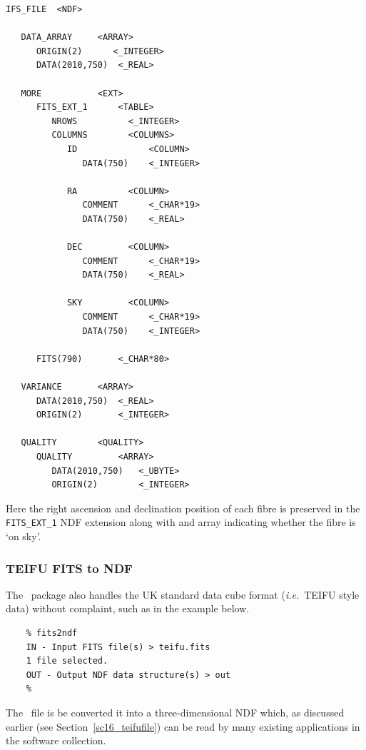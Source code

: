 \documentclass[twoside,11pt]{article}
\newcommand{\htmlref}[2]{#1}
\newcommand{\latex}[1]{#1}
\newcommand{\xref}[3]{#1}
\begin{document}
\small\begin{verbatim}
IFS_FILE  <NDF>

   DATA_ARRAY     <ARRAY>
      ORIGIN(2)      <_INTEGER>
      DATA(2010,750)  <_REAL>

   MORE           <EXT>
      FITS_EXT_1      <TABLE>
         NROWS          <_INTEGER>
         COLUMNS        <COLUMNS>
            ID              <COLUMN>
               DATA(750)    <_INTEGER>

            RA          <COLUMN>
               COMMENT      <_CHAR*19>
               DATA(750)    <_REAL>

            DEC         <COLUMN>
               COMMENT      <_CHAR*19>
               DATA(750)    <_REAL>

            SKY         <COLUMN>
               COMMENT      <_CHAR*19>
               DATA(750)    <_INTEGER> 

      FITS(790)       <_CHAR*80>

   VARIANCE       <ARRAY> 
      DATA(2010,750)  <_REAL>
      ORIGIN(2)       <_INTEGER>

   QUALITY        <QUALITY>
      QUALITY         <ARRAY>
         DATA(2010,750)   <_UBYTE>
         ORIGIN(2)        <_INTEGER>
\end{verbatim}\normalsize

Here the right ascension and declination position of each fibre is preserved in the
{\tt FITS\_EXT\_1} NDF extension along with and array indicating
whether the fibre is `on sky'.

\subsubsection{TEIFU FITS to NDF}

The \CONVERTref\ package also handles the UK standard data
cube format (\emph{i.e.}\ TEIFU style data) without complaint, such as
in the example below.

\begin{verbatim}
    % fits2ndf
    IN - Input FITS file(s) > teifu.fits
    1 file selected.
    OUT - Output NDF data structure(s) > out
    % 
\end{verbatim}

The \FITSref\ file is be converted it into a three-dimensional
\xref{NDF}{sun33}{} which, as \htmlref{discussed
earlier}{sc16_teifufile}\latex{ (see
Section~\ref{sc16_teifufile})} can be read by many existing
applications in the software collection.
\end{document}
